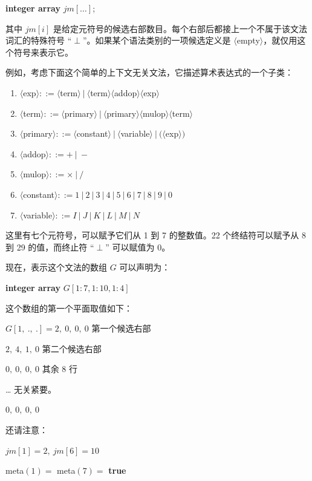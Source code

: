 \quad \textbf{integer array} $jm[\dots]$;

\noindent
其中 $jm[i]$ 是给定元符号的候选右部数目。每个右部后都接上一个不属于该文法词汇的特殊符号 ``$\perp$''。如果某个语法类别的一项候选定义是 $\langle$empty$\rangle$，就仅用这个符号来表示它。

例如，考虑下面这个简单的上下文无关文法，它描述算术表达式的一个子类：

\begin{enumerate}[wide, nosep, label=(\arabic*)]
	\item $\langle$exp$\rangle ::= \langle$term$\rangle\ |\ \langle$term$\rangle\langle$addop$\rangle\langle$exp$\rangle$
	\item $\langle$term$\rangle ::= \langle$primary$\rangle\ |\ \langle$primary$\rangle\langle$mulop$\rangle\langle$term$\rangle$
	\item $\langle$primary$\rangle ::= \langle$constant$\rangle\ |\ \langle$variable$\rangle\ |\ (\langle$exp$\rangle)$
	\item $\langle$addop$\rangle ::= +\ |\ -$
	\item $\langle$mulop$\rangle ::= \times\ |\ /$
	\item $\langle$constant$\rangle ::= 1\ |\ 2\ |\ 3\ |\ 4\ |\ 5\ |\ 6\ |\ 7\ |\ 8\ |\ 9\ |\ 0$
	\item $\langle$variable$\rangle ::= I\ |\ J\ |\ K\ |\ L\ |\ M\ |\ N$
\end{enumerate}

\noindent
这里有七个元符号，可以赋予它们从 1 到 7 的整数值。22 个终结符可以赋予从 8 到 29 的值，而终止符 ``$\perp$'' 可以赋值为 0。

现在，表示这个文法的数组 $G$ 可以声明为：

\quad \textbf{integer array} $G[1:7, 1:10, 1:4]$

\noindent
这个数组的第一个平面取值如下：

\quad $G[1,\ .,\ .] = 2,\ 0,\ 0,\ 0$\tabto*{12em} 第一个候选右部

\tabto*{7.4em}$2,\ 4,\ 1,\ 0$\tabto*{12em} 第二个候选右部

\tabto*{7.4em}$0,\ 0,\ 0,\ 0$\tabto*{12em} 其余 8 行

\tabto*{7.4em}\quad\dots\tabto*{12em} 无关紧要。

\tabto*{7.4em}$0,\ 0,\ 0,\ 0$

\noindent
还请注意：

\quad $jm[1] = 2,\ jm[6] = 10$

\quad meta$(1) =$ meta$(7) =$ \textbf{true}

